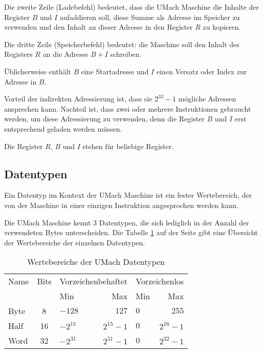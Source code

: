 Die zweite Zeile (Ladebefehl) bedeutet, dass die UMach Maschine die Inhalte der
Register $B$ und $I$ aufaddieren soll, diese Summe als Adresse im
Speicher zu verwenden und den Inhalt an dieser Adresse in den Register $R$ zu
kopieren.

Die dritte Zeile (Speicherbefehl) bedeutet: die Maschine soll den Inhalt des
Registers $R$ an die Adresse $B + I$ schreiben.

Üblicherweise enthält $B$ eine Startadresse und $I$ einen Versatz oder Index zur
Adresse in $B$.

Vorteil der indirekten Adressierung ist, dass sie $2^{33} - 1$ mögliche Adressen
ansprechen kann. Nachteil ist, dass zwei oder mehrere Instruktionen gebraucht
werden, um diese Adressierung zu verwenden, denn die Register $B$ und $I$ erst
entsprechend geladen werden müssen.

Die Register $R$, $B$ und $I$ stehen für beliebige Register.

\subsection{Datentypen}
\label{subsec:Datentypen}

Ein Datentyp im Kontext der UMach Maschine ist ein fester Wertebereich, der von
der Maschine in einer einzigen Instruktion angesprochen werden kann.

Die UMach Maschine kennt 3 Datentypen, die sich lediglich in der Anzahl der 
verwendeten Bytes unterscheiden.
Die Tabelle \ref{tab:Wertebereiche-Datentypen} auf der Seite 
\pageref{tab:Wertebereiche-Datentypen} gibt eine Übersicht der Wertebereiche der
einzelnen Datentypen.

\begin{table}
  \centering
  \begin{tabular}{lclrlr}                                         \toprule
    Name & Bits & \multicolumn{2}{c}{Vorzeichenbehaftet}
                & \multicolumn{2}{c}{Vorzeichenlos}             \\\cmidrule{3-6}
         &      & Min       &   Max       & Min   & Max         \\\midrule
    Byte &  8   & $-128$    & $127$       & $0$   & $255$       \\
    Half & 16   & $-2^{15}$ & $2^{15}-1$  & $0$   & $2^{16}-1$  \\
    Word & 32   & $-2^{31}$ & $2^{31}-1$  & $0$   & $2^{32}-1$  \\\bottomrule
  \end{tabular}
  \caption{Wertebereiche der UMach Datentypen}
  \label{tab:Wertebereiche-Datentypen}
\end{table}

